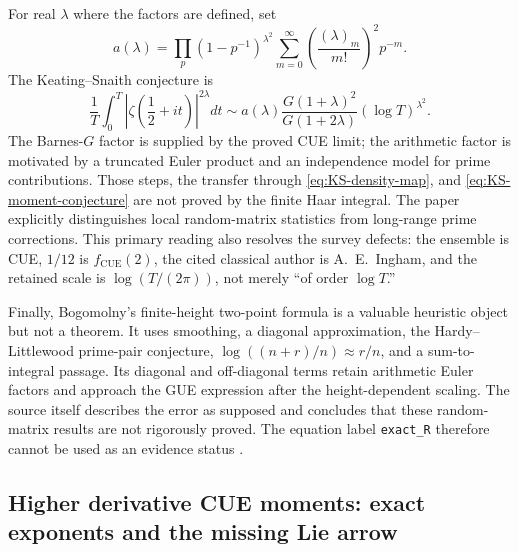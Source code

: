 For real $\lambda$ where the factors are defined, set
\begin{equation}
 a(\lambda)=\prod_p(1-p^{-1})^{\lambda^2}
 \sum_{m=0}^{\infty}
 \left(\frac{(\lambda)_m}{m!}\right)^2p^{-m}.
 \label{eq:KS-arithmetic-factor}
\end{equation}
The Keating--Snaith conjecture is
\cite[eqs.~(4)--(5), (19), and~(93)--(96)]{keatingSnaith2000}
\begin{equation}
 \frac1T\int_0^T
 \left|\zeta\!\left(\frac12+it\right)\right|^{2\lambda}dt
 \sim
 a(\lambda)\frac{G(1+\lambda)^2}{G(1+2\lambda)}
 (\log T)^{\lambda^2}.
 \label{eq:KS-moment-conjecture}
\end{equation}
The Barnes-$G$ factor is supplied by the proved CUE limit; the arithmetic factor is motivated
by a truncated Euler product and an independence model for prime contributions.  Those steps,
the transfer through \eqref{eq:KS-density-map}, and \eqref{eq:KS-moment-conjecture} are not
proved by the finite Haar integral.  The paper explicitly distinguishes local random-matrix
statistics from long-range prime corrections.  This primary reading also resolves the survey
defects: the ensemble is CUE, $1/12$ is $f_{\mathrm{CUE}}(2)$, the cited classical author is
A.~E.~Ingham, and the retained scale is $\log(T/(2\pi))$, not merely ``of order $\log T$.''

Finally, Bogomolny's finite-height two-point formula is a valuable heuristic object but not a
theorem.  It uses smoothing, a diagonal approximation, the Hardy--Littlewood prime-pair
conjecture, $\log((n+r)/n)\approx r/n$, and a sum-to-integral passage.  Its diagonal and
off-diagonal terms retain arithmetic Euler factors and approach the GUE expression after the
height-dependent scaling.  The source itself describes the error as supposed and concludes
that these random-matrix results are not rigorously proved.  The equation label
\texttt{exact\_R} therefore cannot be used as an evidence status
\cite[finite-height two-point calculation]{bogomolny2007}.

\subsection{Higher derivative CUE moments: exact exponents and the missing Lie arrow}

